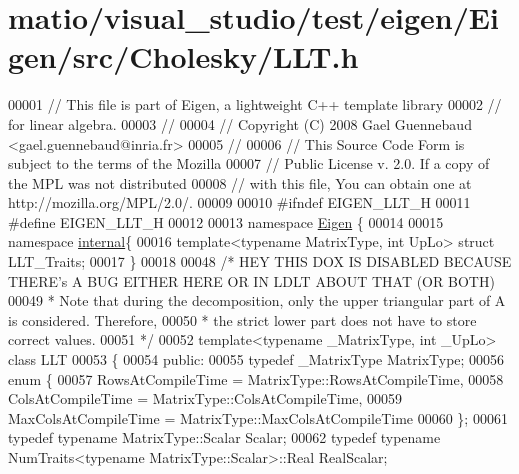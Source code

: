 \hypertarget{matio_2visual__studio_2test_2eigen_2_eigen_2src_2_cholesky_2_l_l_t_8h_source}{}\section{matio/visual\+\_\+studio/test/eigen/\+Eigen/src/\+Cholesky/\+L\+LT.h}
\label{matio_2visual__studio_2test_2eigen_2_eigen_2src_2_cholesky_2_l_l_t_8h_source}

\begin{DoxyCode}
00001 \textcolor{comment}{// This file is part of Eigen, a lightweight C++ template library}
00002 \textcolor{comment}{// for linear algebra.}
00003 \textcolor{comment}{//}
00004 \textcolor{comment}{// Copyright (C) 2008 Gael Guennebaud <gael.guennebaud@inria.fr>}
00005 \textcolor{comment}{//}
00006 \textcolor{comment}{// This Source Code Form is subject to the terms of the Mozilla}
00007 \textcolor{comment}{// Public License v. 2.0. If a copy of the MPL was not distributed}
00008 \textcolor{comment}{// with this file, You can obtain one at http://mozilla.org/MPL/2.0/.}
00009 
00010 \textcolor{preprocessor}{#ifndef EIGEN\_LLT\_H}
00011 \textcolor{preprocessor}{#define EIGEN\_LLT\_H}
00012 
00013 \textcolor{keyword}{namespace }\hyperlink{namespace_eigen}{Eigen} \{
00014 
00015 \textcolor{keyword}{namespace }\hyperlink{namespaceinternal}{internal}\{
00016 \textcolor{keyword}{template}<\textcolor{keyword}{typename} MatrixType, \textcolor{keywordtype}{int} UpLo> \textcolor{keyword}{struct }LLT\_Traits;
00017 \}
00018 
00048  \textcolor{comment}{/* HEY THIS DOX IS DISABLED BECAUSE THERE's A BUG EITHER HERE OR IN LDLT ABOUT THAT (OR BOTH)}
00049 \textcolor{comment}{  * Note that during the decomposition, only the upper triangular part of A is considered. Therefore,}
00050 \textcolor{comment}{  * the strict lower part does not have to store correct values.}
00051 \textcolor{comment}{  */}
00052 \textcolor{keyword}{template}<\textcolor{keyword}{typename} \_MatrixType, \textcolor{keywordtype}{int} \_UpLo> \textcolor{keyword}{class }LLT
00053 \{
00054   \textcolor{keyword}{public}:
00055     \textcolor{keyword}{typedef} \_MatrixType MatrixType;
00056     \textcolor{keyword}{enum} \{
00057       RowsAtCompileTime = MatrixType::RowsAtCompileTime,
00058       ColsAtCompileTime = MatrixType::ColsAtCompileTime,
00059       MaxColsAtCompileTime = MatrixType::MaxColsAtCompileTime
00060     \};
00061     \textcolor{keyword}{typedef} \textcolor{keyword}{typename} MatrixType::Scalar Scalar;
00062     \textcolor{keyword}{typedef} \textcolor{keyword}{typename} NumTraits<typename MatrixType::Scalar>::Real RealScalar;

\end{DoxyCode}
